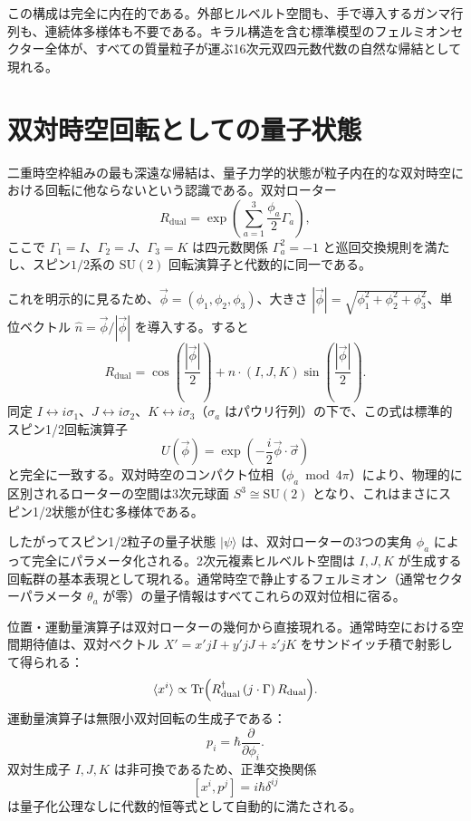 \documentclass[a4paper]{article}
\begin{document}
この構成は完全に内在的である。外部ヒルベルト空間も、手で導入するガンマ行列も、連続体多様体も不要である。キラル構造を含む標準模型のフェルミオンセクター全体が、すべての質量粒子が運ぶ16次元双四元数代数の自然な帰結として現れる。

\section{双対時空回転としての量子状態}
\label{sec:quantumstates}

二重時空枠組みの最も深遠な帰結は、量子力学的状態が粒子内在的な双対時空における回転に他ならないという認識である。双対ローター
\[
R_\text{dual} = \exp\left( \sum_{a=1}^3 \frac{\phi_a}{2} \Gamma_a \right),
\]
ここで $\Gamma_1 = I$、$\Gamma_2 = J$、$\Gamma_3 = K$ は四元数関係 $\Gamma_a^2 = -1$ と巡回交換規則を満たし、スピン$1/2$系の $\mathrm{SU}(2)$ 回転演算子と代数的に同一である。

これを明示的に見るため、$\vec{\phi}=(\phi_1,\phi_2,\phi_3)$、大きさ $|\vec{\phi}|=\sqrt{\phi_1^2+\phi_2^2+\phi_3^2}$、単位ベクトル $\hat{n}=\vec{\phi}/|\vec{\phi}|$ を導入する。すると
\[
R_\text{dual} = \cos\left( \frac{|\vec{\phi}|}{2} \right) + \hat{n} \cdot (I, J, K) \sin\left( \frac{|\vec{\phi}|}{2} \right).
\]
同定 $I \leftrightarrow i\sigma_1$、$J \leftrightarrow i\sigma_2$、$K \leftrightarrow i\sigma_3$（$\sigma_a$ はパウリ行列）の下で、この式は標準的スピン1/2回転演算子
\[
U(\vec{\phi}) = \exp\left( -\frac{i}{2} \vec{\phi} \cdot \vec{\sigma} \right)
\]
と完全に一致する。双対時空のコンパクト位相（$\phi_a \bmod 4\pi$）により、物理的に区別されるローターの空間は3次元球面 $S^3 \cong \mathrm{SU}(2)$ となり、これはまさにスピン1/2状態が住む多様体である。

したがってスピン1/2粒子の量子状態 $|\psi\rangle$ は、双対ローターの3つの実角 $\phi_a$ によって完全にパラメータ化される。2次元複素ヒルベルト空間は $I, J, K$ が生成する回転群の基本表現として現れる。通常時空で静止するフェルミオン（通常セクターパラメータ $\theta_a$ が零）の量子情報はすべてこれらの双対位相に宿る。

位置・運動量演算子は双対ローターの幾何から直接現れる。通常時空における空間期待値は、双対ベクトル $X' = x' jI + y' jJ + z' jK$ をサンドイッチ積で射影して得られる：
\[
\langle x^i \rangle \propto \operatorname{Tr}\Bigl( R_\text{dual}^\dagger \, (j \cdot \Gamma) \, R_\text{dual} \Bigr).
\]
運動量演算子は無限小双対回転の生成子である：
\[
p_i = \hbar \frac{\partial}{\partial \phi_i}.
\]
双対生成子 $I, J, K$ は非可換であるため、正準交換関係
\[
[x^i, p^j] = i\hbar \delta^{ij}
\]
は量子化公理なしに代数的恒等式として自動的に満たされる。
\end{document}
